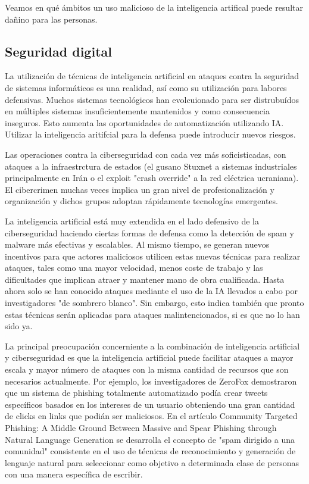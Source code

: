 \documentclass[12pt,a4paper]{article}
\begin{document}
Veamos en qué ámbitos un uso malicioso de la inteligencia artifical puede resultar dañino para las personas.

\subsection{Seguridad digital}

La utilización de técnicas de inteligencia artificial en ataques contra la seguridad de sistemas informáticos es una realidad, así como su utilización para labores defensivas. Muchos sistemas tecnológicos han evolcuionado para ser distrubuídos en múltiples sistemas insuficientemente mantenidos y como consecuencia inseguros. Esto aumenta las oportunidades de automatización utilizando IA. Utilizar la inteligencia aritifcial para la defensa puede introducir nuevos riesgos.

Las operaciones contra la ciberseguridad con cada vez más soficisticadas, con ataques a la infraestrctura de estados (el gusano Stuxnet a sistemas industriales principalmente en Irán o el exploit "crash override" a la red eléctrica ucraniana). El cibercrimen muchas veces implica un gran nivel de profesionalización y organización y dichos grupos adoptan rápidamente tecnologías emergentes.

La inteligencia artificial está muy extendida en el lado defensivo de la ciberseguridad haciendo ciertas formas de defensa como la detección de spam y malware más efectivas y escalables. Al mismo tiempo, se generan nuevos incentivos para que actores maliciosos utilicen estas nuevas técnicas para realizar ataques, tales como una mayor velocidad, menos coste de trabajo y las dificultades que implican atraer y mantener mano de obra cualificada. Hasta ahora solo se han conocido ataques mediante el uso de la IA llevados a cabo por investigadores "de sombrero blanco". Sin embargo, esto indica también que pronto estas técnicas serán aplicadas para ataques malintencionados, si es que no lo han sido ya.

La principal preocupación concerniente a la combinación de inteligencia artificial y ciberseguridad es que la inteligencia artificial puede facilitar ataques a mayor escala y mayor número de ataques con la misma cantidad de recursos que son necesarios actualmente.  Por ejemplo, los investigadores de ZeroFox demostraron que un sistema de phishing totalmente automatizado podía crear tweets específicos basados en los intereses de un usuario obteniendo una gran cantidad de clicks en links que podián ser maliciosos. En el artículo Community Targeted Phishing: A Middle Ground Between Massive and Spear Phishing through Natural Language Generation se desarrolla el concepto de "spam dirigido a una comunidad" consistente en el uso de técnicas de reconocimiento y generación de lenguaje natural para seleccionar como objetivo a determinada clase de personas con una manera específica de escribir.
\end{document}
